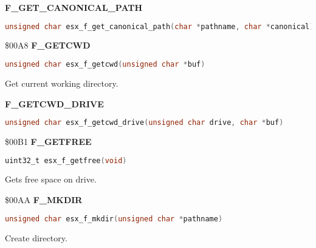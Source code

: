 \textbf{F\_GET\_CANONICAL\_PATH}

\begin{lstlisting}[language=C]
unsigned char esx_f_get_canonical_path(char *pathname, char *canonical)
\end{lstlisting}

\$00A8 \textbf{F\_GETCWD}

\begin{lstlisting}[language=C]
unsigned char esx_f_getcwd(unsigned char *buf)
\end{lstlisting}

Get current working directory.


\textbf{F\_GETCWD\_DRIVE}

\begin{lstlisting}[language=C]
unsigned char esx_f_getcwd_drive(unsigned char drive, char *buf)
\end{lstlisting}

\$00B1 \textbf{F\_GETFREE}

\begin{lstlisting}[language=C]
uint32_t esx_f_getfree(void)
\end{lstlisting}

Gets free space on drive.


\$00AA \textbf{F\_MKDIR}

\begin{lstlisting}[language=C]
unsigned char esx_f_mkdir(unsigned char *pathname)
\end{lstlisting}

Create directory.


